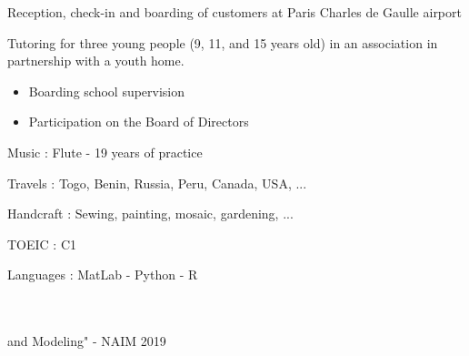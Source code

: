 




   Reception, check-in and boarding of customers at Paris Charles de Gaulle airport

\divider

Tutoring for three young people (9, 11, and 15 years old) in an association in
partnership with a youth home.

\divider

\begin{itemize}
\item Boarding school supervision
\item Participation on the Board of Directors
\end{itemize}



{\large\color{emphasis} \faMusic \vspace{0.2cm}  Music : } 
    Flute - 19 years of practice\\
  \vspace{0.5cm}

{\large\color{emphasis} \faGlobe \vspace{0.2cm} Travels : }  
    Togo, Benin, Russia, Peru, Canada, USA, ...\\
  \vspace{0.5cm}
  
{\large\color{emphasis} \faCut  \vspace{0.2cm} Handcraft : }
    Sewing, painting, mosaic, gardening, ...


TOEIC : C1



Languages : MatLab - Python  - R\\
\vspace{0.5cm}

\vspace{0.5cm}

 \\
 \\ \hspace{0.5cm} and Modeling" - NAIM 2019
    
